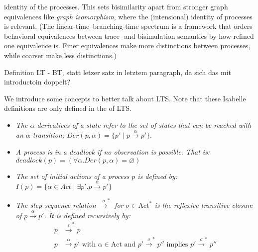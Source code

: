 \begin{isabellebody}
\begin{isamarkuptext}
identity of the processes. This sets bisimilarity apart from stronger graph equivalences like \textit{graph isomorphism}, 
where the (intensional) identity of processes is relevant. 
(The linear-time--branching-time spectrum is a framework that orders behavioral equivalences between trace- and bisimulation semantics by how refined one equivalence is. Finer equivalences make more distinctions between processes, while coarser make less distinctions.)%
\end{isamarkuptext}\isamarkuptrue%
%
\begin{isamarkuptext}%
Definition LT - BT, statt letzer satz in letztem paragraph, da sich das mit introductoin doppelt?%
\end{isamarkuptext}\isamarkuptrue%
%
\begin{isamarkuptext}%
We introduce some concepts to better talk about LTS. Note that these Isabelle definitions are only defined in the  of LTS.%
\end{isamarkuptext}\isamarkuptrue%
%
\isadelimdocument
%
\endisadelimdocument
%
\isatagdocument
%
\isamarkuptrue%
%
\endisatagdocument
{\isafolddocument}%
%
\isadelimdocument
%
\endisadelimdocument
%
\begin{isamarkuptext}%
\begin{itemize}
    \item \textit{The \textnormal{$\alpha$-derivatives} of a state refer to the set of states that can be reached with an $\alpha$-transition:
    $\mathit{Der} (p, \alpha) = \{ p' \mid p \xrightarrow{\alpha} p' \}.$}

    \item \textit{A process is in a \textnormal{deadlock} if no observation is possible. That is:
    $\mathit{deadlock} (p) = (\forall\alpha .\mathit{Der} (p, \alpha) = \varnothing)$}

    \item \textit{The set of \textnormal{initial actions} of a process $p$ is defined by: 
    $I(p)=\{\alpha \in Act \mid \exists p'. p \xrightarrow{\alpha} p'\}$}

    \item \textit{The \textnormal{step sequence relation} $\xrightarrow{\sigma}^*$ for $\sigma \in \text{Act}^*$ is the reflexive transitive closure of $p \xrightarrow{\alpha} p'$.
    It is defined recursively by:
    \begin{align*}
        p &\xrightarrow{\varepsilon}^* p \\
        p &\xrightarrow{\alpha} p' \text{ with } \alpha \in \text{Act} \text{ and } p' \xrightarrow{\sigma}^* p'' \text{ implies } p' \xrightarrow{\sigma}^* p''
    \end{align*}}


\end{itemize}
\end{isamarkuptext}
\end{isabellebody}

